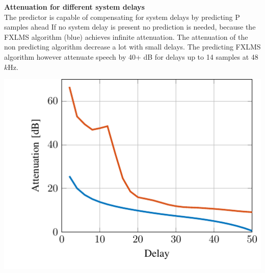 \begin{minipage}{.4\columnwidth}
	\textbf{Attenuation for different system delays}\\
	The predictor is capable of compensating for system delays by predicting P samples ahead	 If no system delay is present no prediction is needed, because the FXLMS algorithm (blue) achieves infinite attenuation. The attenuation of the non predicting algorithm decrease a lot with small delays. The predicting FXLMS algorithm however attenuate speech by 40+ dB for delays up to 14 samples at 48 $k$Hz.
\end{minipage}%
\begin{minipage}{0.5\columnwidth}
	\includegraphics[width=\textwidth]{figures/DelayRatio.pdf}
\end{minipage}


